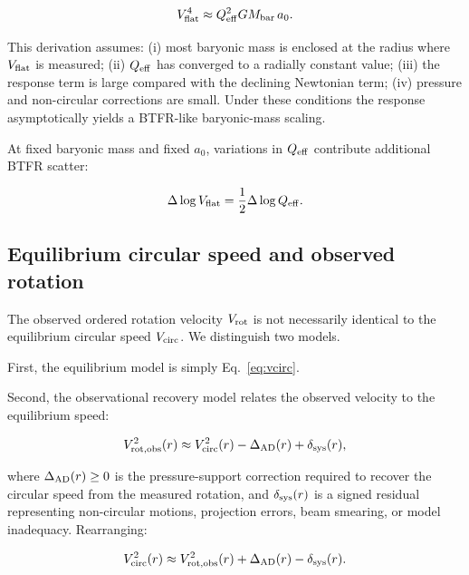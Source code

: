 \documentclass[11pt]{article}
\begin{document}
\begin{equation}
V_{\rm flat}^{4} \approx Q_{\rm eff}^{2} G M_{\rm bar} \, a_{0}.
\label{eq:vflat_bdvr}
\end{equation}

This derivation assumes: (i) most baryonic mass is enclosed at the radius where $V_{\rm flat}$ is measured; (ii) $Q_{\rm eff}$ has converged to a radially constant value; (iii) the response term is large compared with the declining Newtonian term; (iv) pressure and non-circular corrections are small. Under these conditions the response asymptotically yields a BTFR-like baryonic-mass scaling.

At fixed baryonic mass and fixed $a_{0}$, variations in $Q_{\rm eff}$ contribute additional BTFR scatter:

\begin{equation}
\Delta\log V_{\rm flat} = \frac{1}{2}\Delta\log Q_{\rm eff}.
\label{eq:qeff_scatter}
\end{equation}

\subsection{Equilibrium circular speed and observed rotation}

The observed ordered rotation velocity $V_{\rm rot}$ is not necessarily identical to the equilibrium circular speed $V_{\rm circ}$. We distinguish two models.

First, the equilibrium model is simply Eq.~\ref{eq:vcirc}.

Second, the observational recovery model relates the observed velocity to the equilibrium speed:

\begin{equation}
V_{\rm rot,obs}^{2}(r) \approx V_{\rm circ}^{2}(r) - \Delta_{\rm AD}(r) + \delta_{\rm sys}(r),
\label{eq:obs_recovery}
\end{equation}

where $\Delta_{\rm AD}(r) \geq 0$ is the pressure-support correction required to recover the circular speed from the measured rotation, and $\delta_{\rm sys}(r)$ is a signed residual representing non-circular motions, projection errors, beam smearing, or model inadequacy. Rearranging:

\begin{equation}
V_{\rm circ}^{2}(r) \approx V_{\rm rot,obs}^{2}(r) + \Delta_{\rm AD}(r) - \delta_{\rm sys}(r).
\label{eq:circ_from_obs}
\end{equation}
\end{document}

